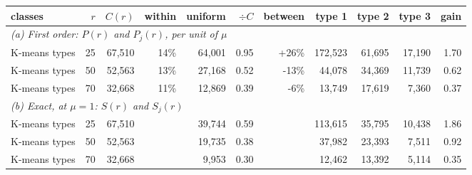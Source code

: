 \begin{tabular}{lrrrrrrrrrr}
\toprule
classes & $r$ & $C(r)$ & within & uniform & $\div C$ & between & type 1 & type 2 & type 3 & gain \\
\midrule
\multicolumn{11}{l}{\textit{(a) First order: $P(r)$ and $P_j(r)$, per unit of $\mu$}} \\
K-means types & 25 & 67,510 & 14\% & 64,001 & 0.95 & +26\% & 172,523 & 61,695 & 17,190 & 1.70 \\
K-means types & 50 & 52,563 & 13\% & 27,168 & 0.52 & -13\% & 44,078 & 34,369 & 11,739 & 0.62 \\
K-means types & 70 & 32,668 & 11\% & 12,869 & 0.39 & -6\% & 13,749 & 17,619 & 7,360 & 0.37 \\
\midrule\multicolumn{11}{l}{\textit{(b) Exact, at $\mu=1$: $S(r)$ and $S_j(r)$}} \\
K-means types & 25 & 67,510 &  & 39,744 & 0.59 &  & 113,615 & 35,795 & 10,438 & 1.86 \\
K-means types & 50 & 52,563 &  & 19,735 & 0.38 &  & 37,982 & 23,393 & 7,511 & 0.92 \\
K-means types & 70 & 32,668 &  & 9,953 & 0.30 &  & 12,462 & 13,392 & 5,114 & 0.35 \\
\bottomrule
\end{tabular}
